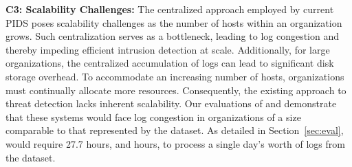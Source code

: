 
\smallskip
\noindent
\textbf{C3: Scalability Challenges:} The centralized approach employed by current PIDS poses scalability challenges as the number of hosts within an organization grows. Such centralization serves as a bottleneck, leading to log congestion and thereby impeding efficient intrusion detection at scale. Additionally, for large organizations, the centralized accumulation of logs can lead to significant disk storage overhead. To accommodate an increasing number of hosts, organizations must continually allocate more resources. Consequently, the existing approach to threat detection lacks inherent scalability. Our evaluations of \flash and \kairos demonstrate that these systems would face log congestion in organizations of a size comparable to that represented by the \optc dataset. As detailed in Section~\ref{sec:eval}, \flash would require 27.7 hours, and  hours, to process a single day's worth of logs from the \optc dataset.
    



